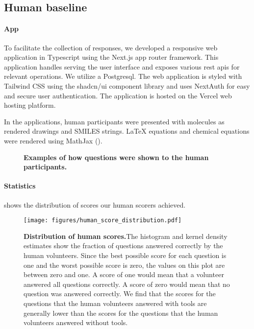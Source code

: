 \clearpage
\subsection{Human baseline} \label{sec:human_baseline}
\paragraph{App} To facilitate the collection of responses, we developed a responsive web application in Typescript using the Next.js\autocite{nextjs} app router framework.
This application handles serving the user interface and exposes various \gls{rest} \glspl{api} for relevant operations.
We utilize a Postgresql.
The web application is styled with Tailwind CSS\autocite{tailwindcss} using the shadcn/ui component library and uses NextAuth\autocite{nextauth} for easy and secure user authentication.
The application is hosted on the Vercel web hosting platform.

In the applications, human participants were presented with molecules as rendered drawings and SMILES strings. \LaTeX\xspace equations and chemical equations were rendered using MathJax ().


\begin{figure}

    \caption{\textbf{Examples of how questions were shown to the human participants.}}
    \label{fig:screenshots}
\end{figure}

\paragraph{Statistics}
 shows the distribution of scores our human scorers achieved.

\begin{figure}[htb]
    \centering
    \texttt{[image: figures/human\_score\_distribution.pdf]}
    \caption{\textbf{Distribution of human scores.}The histogram and kernel density estimates show the fraction of questions answered correctly by the human volunteers.
    Since the best possible score for each question is one and the worst possible score is zero, the values on this plot are between zero and one. A score of one would mean that a volunteer answered all questions correctly. A score of zero would mean that no question was answered correctly. 
    We find that the scores for the questions that the human volunteers answered with tools are generally lower than the scores for the questions that the human volunteers answered without tools.}
    \label{fig:human_score_distribution}
\end{figure}

